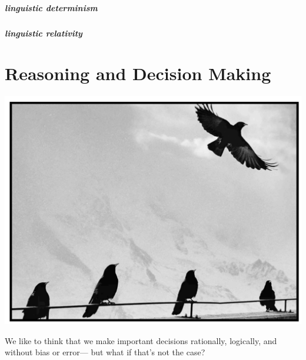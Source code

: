 \documentclass[
]{krantz}
\begin{document}
\hypertarget{linguistic-determinism}{%
\paragraph*{linguistic determinism}\label{linguistic-determinism}}

\hypertarget{linguistic-relativity}{%
\paragraph*{linguistic relativity}\label{linguistic-relativity}}

\hypertarget{reasoning-and-decision-making}{%
\chapter{Reasoning and Decision Making}\label{reasoning-and-decision-making}}

\begin{center}\includegraphics[width=1\linewidth]{images/ch9/fig0} \end{center}

We like to think that we make important decisions rationally, logically, and without bias or error--- but what if that's not the case?
\end{document}

